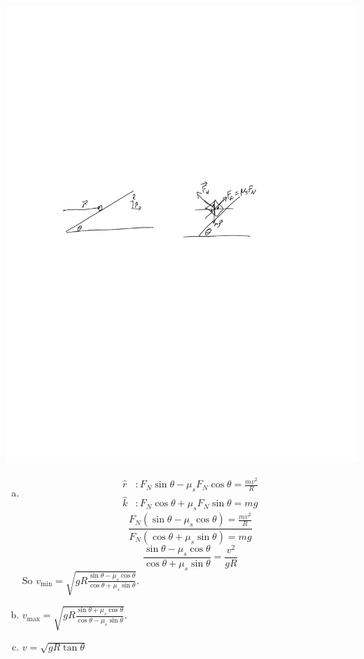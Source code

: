 \documentclass{esg8012pset}
\begin{document}
\begin{solution}
  \begin{center}\includegraphics[width=.5\textwidth]{2009-10-02_Diagram_4_0}\end{center}
  \begin{enumerate}[a)]
    \item \begin{align*}
    \hat r & : F_N\sin\theta -\mu_s F_N\cos\theta = \frac{m v^2}{R} \\
    \hat k & : F_N\cos\theta +\mu_s F_N\sin\theta = mg
    \end{align*}
    $$\frac{F_N(\sin\theta -\mu_s\cos\theta) = \frac{m v^2}{R}}{F_N(\cos\theta +\mu_s \sin\theta) = mg}$$
    $$\frac{\sin\theta -\mu_s\cos\theta}{\cos\theta +\mu_s \sin\theta} = \frac{v^2}{g R}$$
    So $v_{\text{min}} = \sqrt{g R\frac{\sin\theta -\mu_s\cos\theta}{\cos\theta +\mu_s \sin\theta}}$.
    \item $v_{\text{max}} = \sqrt{g R\frac{\sin\theta +\mu_s\cos\theta}{\cos\theta -\mu_s \sin\theta}}$.
    \item $v = \sqrt{g R\tan\theta}$
  \end{enumerate}
\end{solution}
\end{document}
